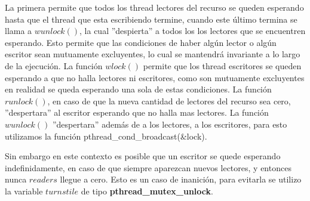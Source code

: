 La primera permite que todos los thread lectores del recurso se queden esperando hasta que el thread que esta escribiendo termine, cuando este último termina se llama a $ wunlock() $, la cual ''despierta'' a todos los los lectores que se encuentren esperando. Esto permite que las condiciones de haber algún lector o algún escritor sean mutuamente excluyentes, lo cual se mantendrá invariante a lo largo de la ejecución. La función $ wlock() $ permite que los thread escritores se queden esperando a que no halla lectores ni escritores, como son mutuamente excluyentes en realidad se queda esperando una sola de estas condiciones. La función $ runlock() $, en caso de que la nueva cantidad de lectores del recurso sea cero, ''despertara'' al escritor esperando que no halla mas lectores. La función $ wunlock() $ ''despertara'' además de a los lectores, a los escritores, para esto utilizamos la función pthread_cond_broadcast(&lock).

Sin embargo en este contexto es posible que un escritor se quede esperando indefinidamente, en caso de que siempre aparezcan nuevos lectores, y entonces nunca $ readers $ llegue a cero. Esto es un caso de inanición, para evitarla se utilizo la variable $ turnstile $ de tipo \textbf{pthread_mutex_unlock}. 

